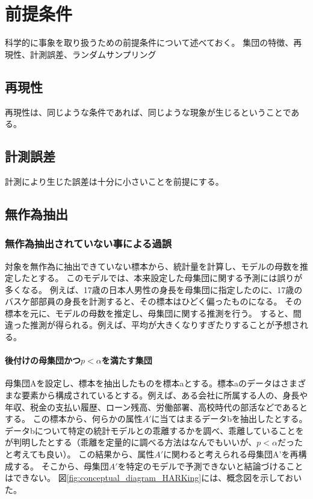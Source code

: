 \chapter{前提条件}
科学的に事象を取り扱うための前提条件について述べておく。
集団の特徴、再現性、計測誤差、ランダムサンプリング

\section{再現性}
再現性は、同じような条件であれば、同じような現象が生じるということである。

\section{計測誤差}
計測により生じた誤差は十分に小さいことを前提にする。

\section{無作為抽出}


\subsection{無作為抽出されていない事による過誤}
対象を無作為に抽出できていない標本から、統計量を計算し、モデルの母数を推定したとする。
このモデルでは、本来設定した母集団に関する予測には誤りが多くなる。
例えば、17歳の日本人男性の身長を母集団に指定したのに、17歳のバスケ部部員の身長を計測すると、その標本はひどく偏ったものになる。
その標本を元に、モデルの母数を推定し、母集団に関する推測を行う。
すると、間違った推測が得られる。例えば、平均が大きくなりすぎたりすることが予想される。

\subsubsection{後付けの母集団かつ$p<\alpha$を満たす集団}
母集団Aを設定し、標本を抽出したものを標本aとする。標本aのデータはさまざまな要素から構成されているとする。例えば、ある会社に所属する人の、身長や年収、税金の支払い履歴、ローン残高、労働部署、高校時代の部活などであるとする。
この標本から、何らかの属性$A'$に当てはまるデータbを抽出したとする。
データbについて特定の統計モデルとの乖離するかを調べ、乖離していることをが判明したとする（乖離を定量的に調べる方法はなんでもいいが、$p<\alpha$だったと考えても良い）。
この結果から、属性$A'$に関わると考えられる母集団A'を再構成する。
そこから、母集団$A'$を特定のモデルで予測できないと結論づけることはできない。
図\ref{fig:conceptual_diagram_HARKing}には、概念図を示しておいた。


